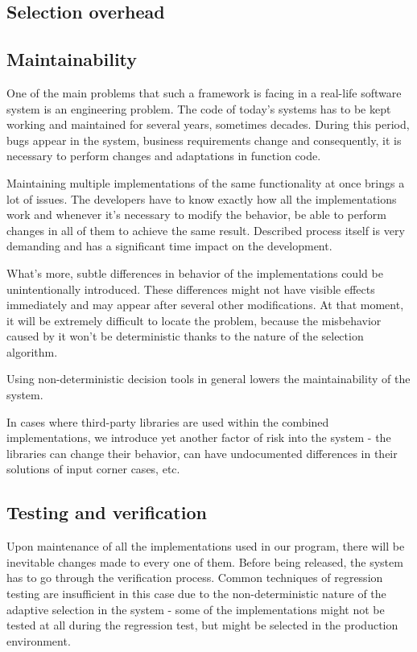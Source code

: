 \subsection{Selection overhead}
\subsection{Maintainability}

One of the main problems that such a framework is facing in a real-life software system is an engineering problem. The code of today's systems has to be kept working and maintained for several years, sometimes decades. During this period, bugs appear in the system, business requirements change and consequently, it is necessary to perform changes and adaptations in function code.

Maintaining multiple implementations of the same functionality at once brings a lot of issues. The developers have to know exactly how all the implementations work and whenever it's necessary to modify the behavior, be able to perform changes in all of them to achieve the same result. Described process itself is very demanding and has a significant time impact on the development. 

What's more, subtle differences in behavior of the implementations could be unintentionally introduced. These differences might not have visible effects immediately and may appear after several other modifications. At that moment, it will be extremely difficult to locate the problem, because the misbehavior caused by it won't be deterministic thanks to the nature of the selection algorithm.

Using non-deterministic decision tools in general lowers the maintainability of the system.

In cases where third-party libraries are used within the combined implementations, we introduce yet another factor of risk into the system - the libraries can change their behavior, can have undocumented differences in their solutions of input corner cases, etc.

\subsection{Testing and verification}

Upon maintenance of all the implementations used in our program, there will be inevitable changes made to every one of them. Before being released, the system has to go through the verification process. Common techniques of regression testing are insufficient in this case due to the non-deterministic nature of the adaptive selection in the system - some of the implementations might not be tested at all during the regression test, but might be selected in the production environment.

